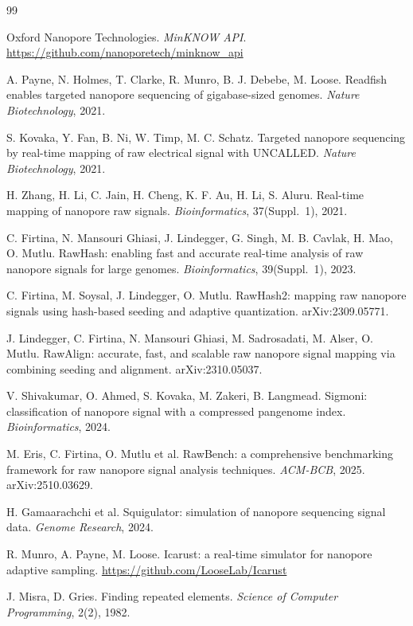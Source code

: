 \documentclass[sigconf,nonacm]{acmart}
\begin{document}
\begin{thebibliography}{99}

 Oxford Nanopore Technologies. \emph{MinKNOW API}.
\url{https://github.com/nanoporetech/minknow_api}

 A. Payne, N. Holmes, T. Clarke, R. Munro, B. J. Debebe, M. Loose. Readfish
enables targeted nanopore sequencing of gigabase-sized genomes. \emph{Nature Biotechnology},
2021.

 S. Kovaka, Y. Fan, B. Ni, W. Timp, M. C. Schatz. Targeted nanopore sequencing
by real-time mapping of raw electrical signal with UNCALLED. \emph{Nature Biotechnology}, 2021.

 H. Zhang, H. Li, C. Jain, H. Cheng, K. F. Au, H. Li, S. Aluru. Real-time
mapping of nanopore raw signals. \emph{Bioinformatics}, 37(Suppl.~1), 2021.

 C. Firtina, N. Mansouri Ghiasi, J. Lindegger, G. Singh, M. B. Cavlak, H. Mao,
O. Mutlu. RawHash: enabling fast and accurate real-time analysis of raw nanopore signals for
large genomes. \emph{Bioinformatics}, 39(Suppl.~1), 2023.

 C. Firtina, M. Soysal, J. Lindegger, O. Mutlu. RawHash2: mapping raw nanopore
signals using hash-based seeding and adaptive quantization. arXiv:2309.05771.

 J. Lindegger, C. Firtina, N. Mansouri Ghiasi, M. Sadrosadati, M. Alser,
O. Mutlu. RawAlign: accurate, fast, and scalable raw nanopore signal mapping via combining
seeding and alignment. arXiv:2310.05037.

 V. Shivakumar, O. Ahmed, S. Kovaka, M. Zakeri, B. Langmead. Sigmoni:
classification of nanopore signal with a compressed pangenome index. \emph{Bioinformatics},
2024.

 M. Eris, C. Firtina, O. Mutlu et al. RawBench: a comprehensive benchmarking
framework for raw nanopore signal analysis techniques. \emph{ACM-BCB}, 2025. arXiv:2510.03629.

 H. Gamaarachchi et al. Squigulator: simulation of nanopore sequencing
signal data. \emph{Genome Research}, 2024.

 R. Munro, A. Payne, M. Loose. Icarust: a real-time simulator for nanopore
adaptive sampling. \url{https://github.com/LooseLab/Icarust}

 J. Misra, D. Gries. Finding repeated elements. \emph{Science of Computer
Programming}, 2(2), 1982.


\end{thebibliography}
\end{document}
